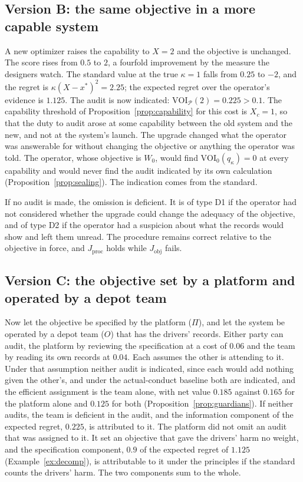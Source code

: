 \documentclass[11pt]{article}
\newcommand{\VOI}{\mathrm{VOI}}
\theoremstyle{plain}
\theoremstyle{definition}
\begin{document}
\subsection*{Version B: the same objective in a more capable system}

A new optimizer raises the capability to $X=2$ and the objective is unchanged. The score rises from $0.5$ to $2$, a fourfold improvement by the measure the designers watch. The standard value at the true $\kappa=1$ falls from $0.25$ to $-2$, and the regret is $\kappa(X-x^*)^2=2.25$; the expected regret over the operator's evidence is $1.125$. The audit is now indicated: $\VOI_{\mathcal P}(2)=0.225>0.1$. The capability threshold of Proposition~\ref{prop:capability} for this cost is $X_c=1$, so that the duty to audit arose at some capability between the old system and the new, and not at the system's launch. The upgrade changed what the operator was answerable for without changing the objective or anything the operator was told. The operator, whose objective is $W_0$, would find $\VOI_0(q_\kappa)=0$ at every capability and would never find the audit indicated by its own calculation (Proposition~\ref{prop:sealing}). The indication comes from the standard.

If no audit is made, the omission is deficient. It is of type D1 if the operator had not considered whether the upgrade could change the adequacy of the objective, and of type D2 if the operator had a suspicion about what the records would show and left them unread. The procedure remains correct relative to the objective in force, and $J_{\mathrm{proc}}$ holds while $J_{\mathrm{obj}}$ fails.

\subsection*{Version C: the objective set by a platform and operated by a depot team}

Now let the objective be specified by the platform ($\Pi$), and let the system be operated by a depot team ($O$) that has the drivers' records. Either party can audit, the platform by reviewing the specification at a cost of $0.06$ and the team by reading its own records at $0.04$. Each assumes the other is attending to it. Under that assumption neither audit is indicated, since each would add nothing given the other's, and under the actual-conduct baseline both are indicated, and the efficient assignment is the team alone, with net value $0.185$ against $0.165$ for the platform alone and $0.125$ for both (Proposition~\ref{prop:guardians}). If neither audits, the team is deficient in the audit, and the information component of the expected regret, $0.225$, is attributed to it. The platform did not omit an audit that was assigned to it. It set an objective that gave the drivers' harm no weight, and the specification component, $0.9$ of the expected regret of $1.125$ (Example~\ref{ex:decomp}), is attributable to it under the principles if the standard counts the drivers' harm. The two components sum to the whole.
\end{document}
